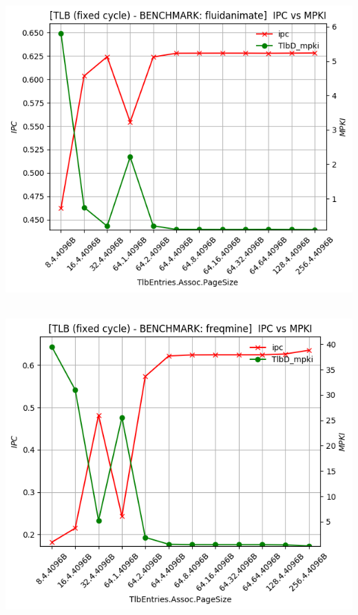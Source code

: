 \begin{minipage}{\textwidth}
    \begin{center}
        \\
        \vspace{3mm}
        \includegraphics[scale=0.70]{graphs/TLB/fixed/fluidanimate.png}
        \vspace{6mm}
    \end{center}
\end{minipage}

\begin{minipage}{\textwidth}
    \begin{center}
        \\
        \vspace{3mm}
        \includegraphics[scale=0.70]{graphs/TLB/fixed/freqmine.png}
        \vspace{6mm}
    \end{center}
\end{minipage}


